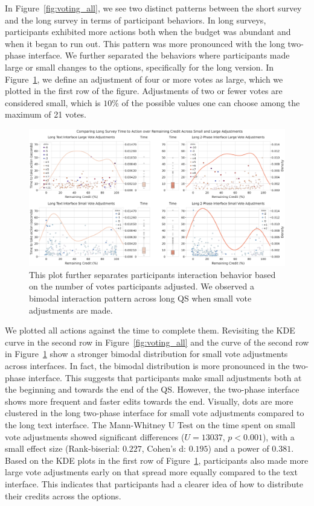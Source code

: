 In Figure~\ref{fig:voting_all}, we see two distinct patterns between the short survey and the long survey in terms of participant behaviors. In long surveys, participants exhibited more actions both when the budget was abundant and when it began to run out. This pattern was more pronounced with the long two-phase interface. We further separated the behaviors where participants made large or small changes to the options, specifically for the long version. In Figure~\ref{fig:voting_v3_v4}, we define an adjustment of four or more votes as large, which we plotted in the first row of the figure. Adjustments of two or fewer votes are considered small, which is $10\%$ of the possible values one can choose among the maximum of 21 votes.

\begin{figure}[ht]
    \centering
    \includegraphics[width=\textwidth]{content/image/results/combined_density_plots.pdf}
    \caption{This plot further separates participants interaction behavior based on the number of votes participants adjusted. We observed a bimodal interaction pattern across long QS when small vote adjustments are made.}
    \label{fig:voting_v3_v4}
\end{figure}

We plotted all actions against the time to complete them. Revisiting the KDE curve in the second row in Figure~\ref{fig:voting_all} and the curve of the second row in Figure~\ref{fig:voting_v3_v4} show a stronger bimodal distribution for small vote adjustments across interfaces. In fact, the bimodal distribution is more pronounced in the two-phase interface. This suggests that participants make small adjustments both at the beginning and towards the end of the QS. However, the two-phase interface shows more frequent and faster edits towards the end. Visually, dots are more clustered in the long two-phase interface for small vote adjustments compared to the long text interface. The Mann-Whitney U Test on the time spent on small vote adjustments showed significant differences ($U=13037$, $p<0.001$), with a small effect size (Rank-biserial: $0.227$, Cohen's d: $0.195$) and a power of $0.381$. Based on the KDE plots in the first row of Figure~\ref{fig:voting_v3_v4}, participants also made more large vote adjustments early on that spread more equally compared to the text interface. This indicates that participants had a clearer idea of how to distribute their credits across the options.

